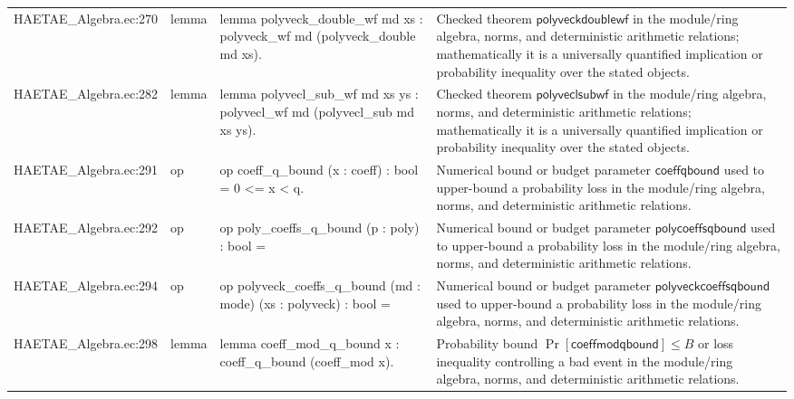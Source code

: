 \documentclass[10pt]{article}
\begin{document}
\begin{longtable}{L{0.11\textwidth}L{0.055\textwidth}L{0.385\textwidth}L{0.41\textwidth}}
HAETAE\_\allowbreak{}Algebra.\allowbreak{}ec:\allowbreak{}270 & lemma & {\ttfamily\scriptsize lemma polyveck\_\allowbreak{}double\_\allowbreak{}wf md xs : polyveck\_\allowbreak{}wf md (polyveck\_\allowbreak{}double md xs).} & Checked theorem $\mathsf{polyveckdoublewf}$ in the module/ring algebra, norms, and deterministic arithmetic relations; mathematically it is a universally quantified implication or probability inequality over the stated objects. \\
HAETAE\_\allowbreak{}Algebra.\allowbreak{}ec:\allowbreak{}282 & lemma & {\ttfamily\scriptsize lemma polyvecl\_\allowbreak{}sub\_\allowbreak{}wf md xs ys : polyvecl\_\allowbreak{}wf md (polyvecl\_\allowbreak{}sub md xs ys).} & Checked theorem $\mathsf{polyveclsubwf}$ in the module/ring algebra, norms, and deterministic arithmetic relations; mathematically it is a universally quantified implication or probability inequality over the stated objects. \\
HAETAE\_\allowbreak{}Algebra.\allowbreak{}ec:\allowbreak{}291 & op & {\ttfamily\scriptsize op coeff\_\allowbreak{}q\_\allowbreak{}bound (x : coeff) : bool = 0 \textless{}= x \textless{} q.} & Numerical bound or budget parameter $\mathsf{coeffqbound}$ used to upper-bound a probability loss in the module/ring algebra, norms, and deterministic arithmetic relations. \\
HAETAE\_\allowbreak{}Algebra.\allowbreak{}ec:\allowbreak{}292 & op & {\ttfamily\scriptsize op poly\_\allowbreak{}coeffs\_\allowbreak{}q\_\allowbreak{}bound (p : poly) : bool =} & Numerical bound or budget parameter $\mathsf{polycoeffsqbound}$ used to upper-bound a probability loss in the module/ring algebra, norms, and deterministic arithmetic relations. \\
HAETAE\_\allowbreak{}Algebra.\allowbreak{}ec:\allowbreak{}294 & op & {\ttfamily\scriptsize op polyveck\_\allowbreak{}coeffs\_\allowbreak{}q\_\allowbreak{}bound (md : mode) (xs : polyveck) : bool =} & Numerical bound or budget parameter $\mathsf{polyveckcoeffsqbound}$ used to upper-bound a probability loss in the module/ring algebra, norms, and deterministic arithmetic relations. \\
HAETAE\_\allowbreak{}Algebra.\allowbreak{}ec:\allowbreak{}298 & lemma & {\ttfamily\scriptsize lemma coeff\_\allowbreak{}mod\_\allowbreak{}q\_\allowbreak{}bound x : coeff\_\allowbreak{}q\_\allowbreak{}bound (coeff\_\allowbreak{}mod x).} & Probability bound $\Pr[\mathsf{coeffmodqbound}]\le B$ or loss inequality controlling a bad event in the module/ring algebra, norms, and deterministic arithmetic relations. \\

\end{longtable}
\end{document}
